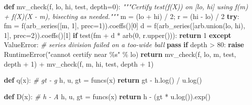 \documentclass[
  11pt,
]{article}
\newenvironment{Shaded}{}{}
\newcommand{\CommentTok}[1]{\textcolor[rgb]{0.38,0.63,0.69}{\textit{#1}}}
\newcommand{\ControlFlowTok}[1]{\textcolor[rgb]{0.00,0.44,0.13}{\textbf{#1}}}
\newcommand{\DecValTok}[1]{\textcolor[rgb]{0.25,0.63,0.44}{#1}}
\newcommand{\KeywordTok}[1]{\textcolor[rgb]{0.00,0.44,0.13}{\textbf{#1}}}
\newcommand{\NormalTok}[1]{#1}
\newcommand{\OperatorTok}[1]{\textcolor[rgb]{0.40,0.40,0.40}{#1}}
\newcommand{\PreprocessorTok}[1]{\textcolor[rgb]{0.74,0.48,0.00}{#1}}
\newcommand{\SpecialCharTok}[1]{\textcolor[rgb]{0.25,0.44,0.63}{#1}}
\newcommand{\StringTok}[1]{\textcolor[rgb]{0.25,0.44,0.63}{#1}}
\begin{document}
\begin{Shaded}
\begin{Highlighting}[]
\KeywordTok{def}\NormalTok{ mv\_check(f, lo, hi, test, depth}\OperatorTok{=}\DecValTok{0}\NormalTok{):}
    \CommentTok{"""Certify test(f(X)) on [lo, hi] using f(m) + f\textquotesingle{}(X)(X {-} m), bisecting as needed."""}
\NormalTok{    m }\OperatorTok{=}\NormalTok{ (lo }\OperatorTok{+}\NormalTok{ hi) }\OperatorTok{/} \DecValTok{2}\OperatorTok{;}\NormalTok{ r }\OperatorTok{=}\NormalTok{ (hi }\OperatorTok{{-}}\NormalTok{ lo) }\OperatorTok{/} \DecValTok{2}
    \ControlFlowTok{try}\NormalTok{:}
\NormalTok{        fm }\OperatorTok{=}\NormalTok{ f(arb\_series([m, }\DecValTok{1}\NormalTok{], prec}\OperatorTok{=}\DecValTok{1}\NormalTok{)).coeffs()[}\DecValTok{0}\NormalTok{]}
\NormalTok{        d }\OperatorTok{=}\NormalTok{ f(arb\_series([arb.union(lo, hi), }\DecValTok{1}\NormalTok{], prec}\OperatorTok{=}\DecValTok{2}\NormalTok{)).coeffs()[}\DecValTok{1}\NormalTok{]}
        \ControlFlowTok{if}\NormalTok{ test(fm }\OperatorTok{+}\NormalTok{ d }\OperatorTok{*}\NormalTok{ arb(}\DecValTok{0}\NormalTok{, r.upper())):}
            \ControlFlowTok{return} \DecValTok{1}
    \ControlFlowTok{except} \PreprocessorTok{ValueError}\NormalTok{:          }\CommentTok{\# series division failed on a too{-}wide ball}
        \ControlFlowTok{pass}
    \ControlFlowTok{if}\NormalTok{ depth }\OperatorTok{\textgreater{}} \DecValTok{80}\NormalTok{:}
        \ControlFlowTok{raise} \PreprocessorTok{RuntimeError}\NormalTok{(}\StringTok{"cannot certify near }\SpecialCharTok{\%s}\StringTok{"} \OperatorTok{\%}\NormalTok{ lo)}
    \ControlFlowTok{return}\NormalTok{ mv\_check(f, lo, m, test, depth }\OperatorTok{+} \DecValTok{1}\NormalTok{) }\OperatorTok{+}\NormalTok{ mv\_check(f, m, hi, test, depth }\OperatorTok{+} \DecValTok{1}\NormalTok{)}

\KeywordTok{def}\NormalTok{ q(x):                        }\CommentTok{\# gt {-} g}
\NormalTok{    h, u, gt }\OperatorTok{=}\NormalTok{ funcs(x)}
    \ControlFlowTok{return}\NormalTok{ gt }\OperatorTok{{-}}\NormalTok{ h.log() }\OperatorTok{/}\NormalTok{ u.log()}

\KeywordTok{def}\NormalTok{ D(x):                        }\CommentTok{\# h {-} A}
\NormalTok{    h, u, gt }\OperatorTok{=}\NormalTok{ funcs(x)}
    \ControlFlowTok{return}\NormalTok{ h }\OperatorTok{{-}}\NormalTok{ (gt }\OperatorTok{*}\NormalTok{ u.log()).exp()}


\end{Highlighting}
\end{Shaded}
\end{document}
